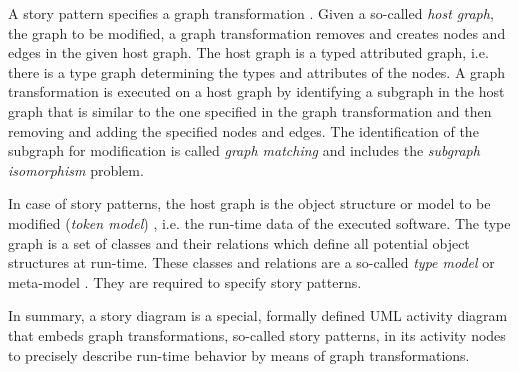 A story pattern specifies a graph transformation \cite{Roz97}.
Given a so-called \emph{host graph}, the graph to be modified, a graph transformation removes and creates nodes and edges in the given host graph.
The host graph is a typed attributed graph, i.e. there is a type graph determining the types and attributes of the nodes.
A graph transformation is executed on a host graph by identifying a subgraph in the host graph that is similar to the one specified in the graph transformation and then removing and adding the specified nodes and edges.
The identification of the subgraph for modification is called \emph{graph matching} and includes the \emph{subgraph isomorphism} problem.

In case of story patterns, the host graph is the object structure or model to be modified (\emph{token model}) \cite{Kue06},
i.e. the run-time data of the executed software.
The type graph is a set of classes and their relations which define all potential object structures at run-time.
These classes and relations are a so-called \emph{type model} or meta-model \cite{Kue06}.
They are required to specify story patterns.

In summary, a story diagram is a special, formally defined UML activity diagram
that embeds graph transformations, so-called story patterns, in its activity nodes
to precisely describe run-time behavior by means of graph transformations.


